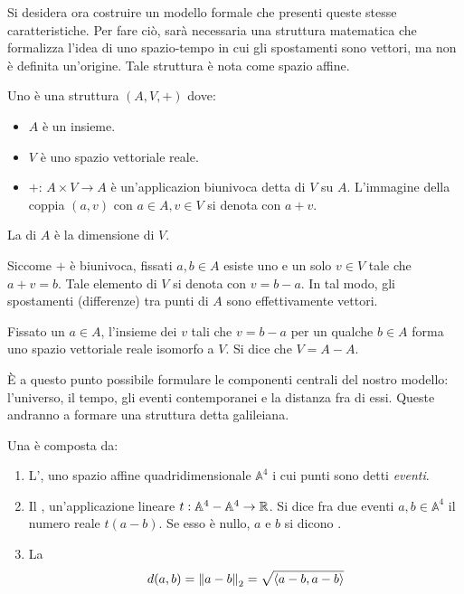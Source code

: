 Si desidera ora costruire un modello formale che presenti queste stesse caratteristiche. Per fare ciò, sarà necessaria una struttura matematica che formalizza l'idea di uno spazio-tempo in cui gli spostamenti sono vettori, ma non è definita un'origine. Tale struttura è nota come spazio affine.
\begin{definition}
  Uno  è una struttura $(A,V,+)$ dove:
  \begin{itemize}
    \item $A$ è un insieme.
    \item $V$ è uno spazio vettoriale reale.
    \item $+:\, A\times V \to A$ è un'applicazion biunivoca detta  di $V$ su $A$. L'immagine della coppia $(a,v)$ con $a \in  A, v \in V$ si denota con $a+v$.
  \end{itemize}
  La  di $A$ è la dimensione di $V$.
\end{definition}
\begin{remark}
  Siccome $+$ è biunivoca, fissati $a,b \in A$ esiste uno e un solo $v \in V$ tale che $a + v = b$. Tale elemento di $V$ si denota con $v = b - a$. In tal modo, gli spostamenti (differenze) tra punti di $A$ sono effettivamente vettori.
\end{remark}
\begin{remark}
Fissato un $a \in A$, l'insieme dei $v$ tali che $v = b - a$ per un qualche $b \in A$ forma uno spazio vettoriale reale isomorfo a $V$. Si dice che $V = A - A$.
\end{remark}

È a questo punto possibile formulare le componenti centrali del nostro modello: l'universo, il tempo, gli eventi contemporanei e la distanza fra di essi. Queste andranno a formare una struttura detta galileiana.
\begin{definition}
  Una  è composta da:
  \begin{enumerate}
    \item L', uno spazio affine quadridimensionale $\mathbb{A}^4$ i cui punti sono detti \emph{eventi}.
    \item Il , un'applicazione lineare $t:\mathbb{A}^4 - \mathbb{A}^4 \to \mathbb{R}$. Si dice  fra due eventi $a,b \in \mathbb{A}^4$ il numero reale $t(a-b)$. Se esso è nullo, $a$ e $b$ si dicono .
    \item La  \begin{equation*}
    d(a,b) = \norm{a-b}_2 = \sqrt{\ev{a-b,a-b}}  
    \end{equation*} 
  \end{enumerate}
\end{definition}

